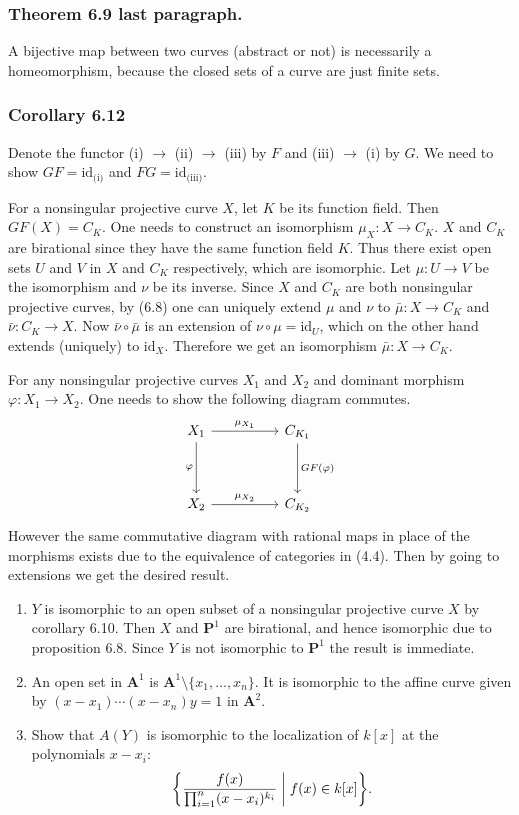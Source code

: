 \documentclass{note}
\newcommand{\Affine}[1]{\mathbf{A}^{#1}}
\newcommand{\Proj}[1]{\mathbf{P}^{#1}}
\newcommand{\id}{\mathrm{id}}
\begin{document}
\subsubsection*{Theorem 6.9 last paragraph.}
A bijective map between two curves (abstract or not) is necessarily a
homeomorphism, because the closed sets of a curve are just finite
sets.

\subsubsection*{Corollary 6.12}
Denote the functor (i) $\to$ (ii) $\to$ (iii) by $F$ and (iii) $\to$
(i) by $G$. We need to show $GF=\id_{\text{(i)}}$ and
$FG=\id_{\text{(iii)}}$.

For a nonsingular projective curve $X$, let $K$ be its function
field. Then $GF(X) = C_K$. One needs to construct an isomorphism
$\mu_X\colon X\to C_K$. $X$ and $C_K$ are birational since they have
the same function field $K$. Thus there exist open sets $U$ and $V$ in
$X$ and $C_K$ respectively, which are isomorphic. Let
$\mu\colon U\to V$ be the isomorphism and $\nu$ be its inverse. Since
$X$ and $C_K$ are both nonsingular projective curves, by (6.8) one can
uniquely extend $\mu$ and $\nu$ to $\bar\mu\colon X\to C_K$ and
$\bar\nu\colon C_K\to X$. Now $\bar\nu\circ\bar\mu$ is an extension of
$\nu\circ\mu = \id_U$, which on the other hand extends (uniquely) to
$\id_X$. Therefore we get an isomorphism $\bar\mu\colon X\to C_K$.

For any nonsingular projective curves $X_1$ and $X_2$ and dominant
morphism $\varphi\colon X_1\to X_2$. One needs to show the following
diagram commutes.
\begin{equation*}
  \begin{tikzcd}[row sep=huge,column sep=huge]
    X_1 \arrow{r}{\mu_{X_1}} \arrow[swap]{d}{\varphi} & C_{K_1}
    \arrow{d}{GF(\varphi)} \\%
    X_2 \arrow{r}{\mu_{X_2}} & C_{K_2}
  \end{tikzcd}
\end{equation*}
However the same commutative diagram with rational maps in place of
the morphisms exists due to the equivalence of categories in
(4.4). Then by going to extensions we get the desired result.

\begin{enumerate}
\item $Y$ is isomorphic to an open subset of a nonsingular projective
  curve $X$ by corollary 6.10. Then $X$ and $\Proj1$ are birational,
  and hence isomorphic due to proposition 6.8. Since $Y$ is not
  isomorphic to $\Proj1$ the result is immediate.
\item An open set in $\Affine1$ is
  $\Affine1\setminus\{x_1,\dots,x_n\}$. It is isomorphic to the affine
  curve given by $(x-x_1)\cdots(x-x_n)y=1$ in $\Affine2$.
\item Show that $A(Y)$ is isomorphic to the localization of $k[x]$ at
  the polynomials $x-x_i\colon$
  \begin{equation*}
    \left\{ \frac{f(x)}{\prod_{i=1}^n(x-x_i)^{k_i}} \biggm\vert
      f(x) \in k[x] \right\}.
  \end{equation*}
\end{enumerate}
\end{document}
